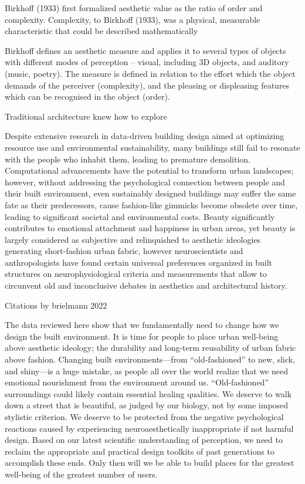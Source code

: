 Birkhoff (1933)\cite{Birkhoff1933} first formalized aesthetic value as the ratio of order and complexity.
Complexity, to Birkhoff (1933), was a
physical, measurable characteristic that could be described
mathematically \cite{Bies2016}

Birkhoff\cite{Birkhoff1933} defines an aesthetic measure and applies it to several types of objects with different modes of perception – visual, including
3D objects, and auditory (music, poetry).
The measure is defined in relation to the effort which the object demands of the perceiver (complexity), and the pleasing or displeasing features which can be recognised in the object (order).\cite{Douchova2016}




Traditional architecture knew how to explore \cite{Browning2014}



Despite extensive research in data-driven building design aimed at optimizing resource use and environmental sustainability, many buildings still fail to resonate with the people who inhabit them, leading to premature demolition.
Computational advancements have the potential to transform urban landscapes; however, without addressing the psychological connection between people and their built environment, even sustainably designed buildings may suffer the same fate as their predecessors, cause fashion-like gimmicks become obsolete over time, leading to significant societal and environmental costs\cite{Aesthetic2022}.
Beauty significantly contributes to emotional attachment and happiness in urban areas\cite{Brielmann2022}, yet beauty is largely considered as subjective and relinquished to aesthetic ideologies generating short-fashion urban fabric, however neuroscientists and anthropologists have found certain universal preferences organized in built structures on neurophysiological criteria and measurements that allow to circunvent old and inconclusive debates in aesthetics and architectural history\cite{Brielmann2022}.

Citations by brielmann 2022

The data reviewed here show that we fundamentally need to change how we design
the built environment.
It is time for people to place urban well-being above aesthetic ideology; the durability and long-term reusability of urban fabric above fashion. Changing
built environments—from “old-fashioned” to new, slick, and shiny—is a huge mistake, as people all over the world realize that we need emotional nourishment from the environment around us.
“Old-fashioned” surroundings could likely contain essential healing qualities.
We deserve to walk down a street that is beautiful, as judged by our biology, not by
some imposed stylistic criterion.
We deserve to be protected from the negative psychological reactions caused by experiencing neuroaesthetically inappropriate if not harmful design.
Based on our latest scientific understanding of perception, we need to reclaim
the appropriate and practical design toolkits of past generations to accomplish these ends.
Only then will we be able to build places for the greatest well-being of the greatest number of users.


